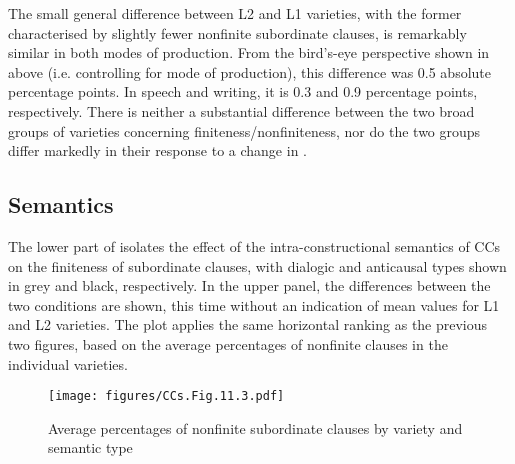 The small general difference between L2 and L1 varieties, with the former characterised by slightly fewer nonfinite subordinate clauses, is remarkably similar in both modes of production. From the bird’s-eye perspective shown in  above (i.e. controlling for mode of production), this difference was 0.5 absolute percentage points. In speech and writing, it is 0.3 and 0.9 percentage points, respectively. There is neither a substantial difference between the two broad groups of varieties concerning finiteness/nonfiniteness, nor do the two groups differ markedly in their response to a change in .

\subsection{\label{bkm:Ref75784106}Semantics}\label{sec:11.2.2}

The lower part of  isolates the effect of the intra-constructional semantics of CCs on the finiteness of subordinate clauses, with dialogic and anticausal types shown in grey and black, respectively. In the upper panel, the differences between the two conditions are shown, this time without an indication of mean values for L1 and L2 varieties. The plot applies the same horizontal ranking as the previous two figures, based on the average percentages of nonfinite clauses in the individual varieties.

\begin{figure}
\texttt{[image: figures/CCs.Fig.11.3.pdf]}
\caption{\label{bkm:Ref75862620}\label{fig:11.3}Average percentages of nonfinite subordinate clauses by variety and semantic type}
\end{figure}

